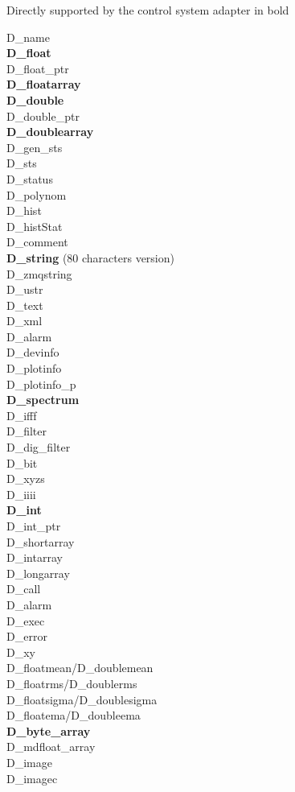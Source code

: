 \documentclass[11pt,a4paper]{scrartcl}
\begin{document}
Directly supported by the control system adapter in bold
\begin{multicols}{3}
\noindent D\_name \\
\textbf{D\_float}\\
D\_float\_ptr \\
\textbf{D\_floatarray}\\
\textbf{D\_double}\\
D\_double\_ptr \\
\textbf{D\_doublearray}\\
D\_gen\_sts \\
D\_sts \\
D\_status \\
D\_polynom \\
D\_hist \\
D\_histStat \\
D\_comment \\
\textbf{D\_string} (80 characters version)\\
D\_zmqstring \\
D\_ustr \\
D\_text \\
D\_xml \\
D\_alarm \\
D\_devinfo \\
D\_plotinfo \\
D\_plotinfo\_p \\
\textbf{D\_spectrum} \\
D\_ifff \\
D\_filter \\
D\_dig\_filter \\
D\_bit \\
D\_xyzs \\
D\_iiii \\
\textbf{D\_int}\\
D\_int\_ptr \\
D\_shortarray\\
D\_intarray\\
D\_longarray\\
D\_call \\
D\_alarm \\
D\_exec \\
D\_error \\
D\_xy \\
D\_floatmean/D\_doublemean \\
D\_floatrms/D\_doublerms \\
D\_floatsigma/D\_doublesigma \\
D\_floatema/D\_doubleema \\
\textbf{D\_byte\_array}\\
D\_mdfloat\_array \\
D\_image \\
D\_imagec
\end{multicols}
\end{document}
